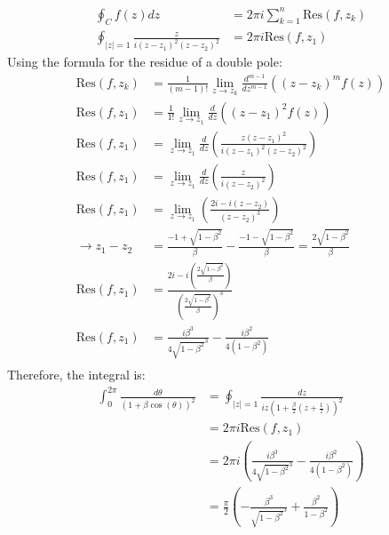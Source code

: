 \begin{example}
    \begin{align*}
        \oint_C f(z)dz                                  & = 2\pi i \sum_{k=1}^n \text{Res}(f, z_k) \\
        \oint_{|z|=1} \frac{z}{i(z - z_1)^2(z - z_2)^2} & = 2\pi i \text{Res}(f, z_1)
    \end{align*}
    Using the formula for the residue of a double pole:
    \begin{align*}
        \text{Res}(f,z_k)     & = \frac{1}{(m - 1)!}\lim_{z \to z_k} \frac{d^{m-1}}{dz^{m-1}} ((z - z_k)^m f(z))                          \\
        \text{Res}(f,z_1)     & = \frac{1}{1!}\lim_{z \to z_1} \frac{d}{dz} \left( (z - z_1)^2 f(z) \right)                               \\
        \text{Res}(f,z_1)     & = \lim_{z \to z_1} \frac{d}{dz} \left(\frac{z(z - z_1)^2}{i(z - z_1)^2(z - z_2)^2} \right)                \\
        \text{Res}(f,z_1)     & = \lim_{z \to z_1} \frac{d}{dz} \left(\frac{z}{i(z - z_2)^2} \right)                                      \\
        \text{Res}(f,z_1)     & = \lim_{z \to z_1} \left(\frac{2i - i(z-z_2)}{(z - z_2)^3} \right)                                        \\
        \rightarrow z_1 - z_2 & = \frac{-1+\sqrt{1-\beta^2}}{\beta} - \frac{-1-\sqrt{1-\beta^2}}{\beta} = \frac{2\sqrt{1-\beta^2}}{\beta} \\
        \text{Res}(f,z_1)     & = \frac{2i - i(\frac{2\sqrt{1-\beta^2}}{\beta})}{(\frac{2\sqrt{1-\beta^2}}{\beta})^3}                     \\
        \text{Res}(f,z_1)     & = \frac{i\beta^3}{4\sqrt{1-\beta^2}^3} - \frac{i\beta^2}{4(1-\beta^2)}                                    \\
    \end{align*}
    Therefore, the integral is:
    \begin{align*}
        \int_0^{2\pi}\frac{d\theta}{(1+\beta\cos(\theta))^2} & = \oint_{|z|=1} \frac{dz}{iz(1 + \frac{\beta}{2}(z + \frac{1}{z}))^{2}}                        \\
                                                             & = 2\pi i \text{Res}(f, z_1)                                                                    \\
                                                             & = 2\pi i \left( \frac{i\beta^3}{4\sqrt{1-\beta^2}^3} - \frac{i\beta^2}{4(1-\beta^2)} \right)   \\
                                                             & = \frac{\pi}{2} \left( -\frac{\beta^3}{\sqrt{1-\beta^2}^3} + \frac{\beta^2}{1-\beta^2} \right)
    \end{align*}
\end{example}


